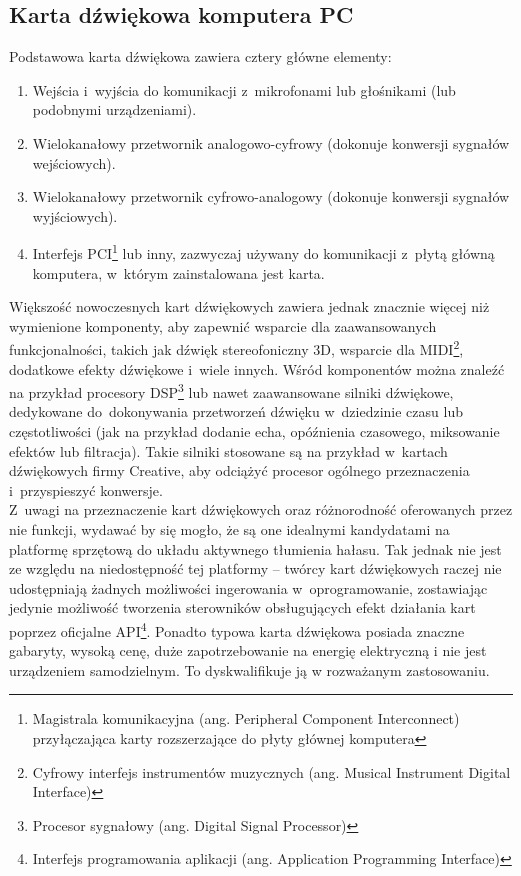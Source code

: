 \subsection{Karta dźwiękowa komputera PC}
\label{soundcard}
Podstawowa karta dźwiękowa zawiera cztery główne elementy:
\begin{enumerate}
	\item Wejścia i~wyjścia do komunikacji z~mikrofonami lub głośnikami (lub podobnymi urządzeniami).
	\item Wielokanałowy przetwornik analogowo-cyfrowy (dokonuje konwersji sygnałów wejściowych).
	\item Wielokanałowy przetwornik cyfrowo-analogowy (dokonuje konwersji sygnałów wyjściowych).
	\item Interfejs PCI\footnote{Magistrala komunikacyjna (ang. Peripheral Component Interconnect) przyłączająca karty rozszerzające do płyty głównej komputera} lub inny, zazwyczaj używany do komunikacji z~płytą główną komputera, w~którym zainstalowana jest karta.
\end{enumerate}
Większość nowoczesnych kart dźwiękowych zawiera jednak znacznie więcej niż wymienione komponenty, aby zapewnić wsparcie dla zaawansowanych funkcjonalności, takich jak dźwięk stereofoniczny 3D, wsparcie dla MIDI\footnote{Cyfrowy interfejs instrumentów muzycznych (ang. Musical Instrument Digital Interface)}, dodatkowe efekty dźwiękowe i~wiele innych. Wśród komponentów można znaleźć na przykład procesory DSP\footnote{Procesor sygnałowy (ang. Digital Signal Processor)} lub nawet zaawansowane silniki dźwiękowe, dedykowane do~dokonywania przetworzeń dźwięku w~dziedzinie czasu lub częstotliwości (jak na przykład dodanie echa, opóźnienia czasowego, miksowanie efektów lub filtracja). Takie silniki stosowane są na przykład w~kartach dźwiękowych firmy Creative, aby odciążyć procesor ogólnego przeznaczenia i~przyspieszyć konwersje.\\
Z~uwagi na przeznaczenie kart dźwiękowych oraz różnorodność oferowanych przez nie funkcji, wydawać by się mogło, że są one idealnymi kandydatami na platformę sprzętową do układu aktywnego tłumienia hałasu. Tak jednak nie jest ze względu na niedostępność tej platformy -- twórcy kart dźwiękowych raczej nie udostępniają żadnych możliwości ingerowania w~oprogramowanie, zostawiając jedynie możliwość tworzenia sterowników obsługujących efekt działania kart poprzez oficjalne API\footnote{Interfejs programowania aplikacji (ang. Application Programming Interface)}. Ponadto typowa karta dźwiękowa posiada znaczne gabaryty, wysoką cenę, duże zapotrzebowanie na energię elektryczną i nie jest urządzeniem samodzielnym. To dyskwalifikuje ją w rozważanym zastosowaniu.
